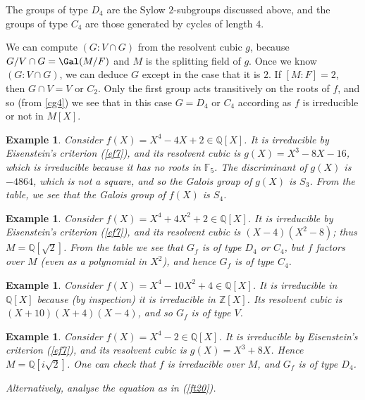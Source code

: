 \documentclass[a4paper,11pt,final,openany]{memoir}
\newtheorem{example}[X]{Example}
\theoremstyle{nonumberplain}
\begin{document}
\noindent The groups of type $D_{4}$ are the Sylow $2$-subgroups discussed
above, and the groups of type $C_{4}$ are those generated by cycles of length
$4$.

We can compute $(G\colon V\cap G)$ from the resolvent cubic $g$, because
$G/V\cap G=\Gal(M/F)$ and $M$ is the splitting field of $g$. Once we know
$(G\colon V\cap G)$, we can deduce $G$ except in the case that it is $2$. If
$[M\colon F]=2$, then $G\cap V=V$ or $C_{2}$. Only the first group acts
transitively on the roots of $f$, and so (from \ref{cg4}) we see that in this
case $G=D_{4}$ or $C_{4}$ according as $f$ is irreducible or not in $M[X]$.

\begin{example}
\label{cg8a}Consider $f(X)=X^{4}-4X+2\in\mathbb{Q}{}[X]$. It is irreducible by
Eisenstein's criterion (\ref{ef7}), and its resolvent cubic is $g(X)=X^{3}%
-8X-16$, which is irreducible because it has no roots in $\mathbb{F}{}_{5}$.
The discriminant of $g(X)$ is $-4864$, which is not a square, and so the
Galois group of $g(X)$ is $S_{3}$. From the table, we see that the Galois
group of $f(X)$ is $S_{4}$.
\end{example}

\begin{example}
\label{cg9}Consider $f(X)=X^{4}+4X^{2}+2\in\mathbb{Q}[X]$. It is irreducible
by Eisenstein's criterion (\ref{ef7}), and its resolvent cubic is
$(X-4)(X^{2}-8)$; thus $M=\mathbb{Q}[\sqrt{2}]$. From the table we see that
$G_{f}$ is of type $D_{4}$ or $C_{4}$, but $f$ factors over $M$ (even as a
polynomial in $X^{2}$), and hence $G_{f}$ is of type $C_{4}$.
\end{example}

\begin{example}
\label{cg10}Consider $f(X)=X^{4}-10X^{2}+4\in\mathbb{Q}[X]$. It is irreducible
in $\mathbb{Q}{}[X]$ because (by inspection) it is irreducible in
$\mathbb{Z}{}[X]$. Its resolvent cubic is $(X+10)(X+4)(X-4)$, and so $G_{f}$
is of type $V$.
\end{example}

\begin{example}
\label{cg11}Consider $f(X)=X^{4}-2\in\mathbb{Q}[X]$. It is irreducible by
Eisenstein's criterion (\ref{ef7}), and its resolvent cubic is $g(X)=X^{3}%
+8X$. Hence $M=\mathbb{Q}[i\sqrt{2}]$. One can check that $f$ is irreducible
over $M$, and $G_{f}$ is of type $D_{4}$.

Alternatively, analyse the equation as in (\ref{ft20}).
\end{example}
\end{document}
